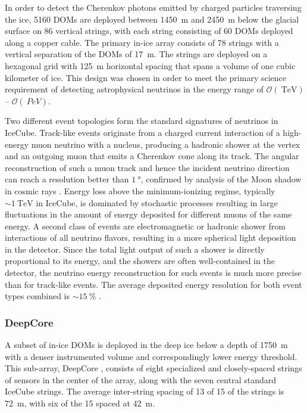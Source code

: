 In order to detect the Cherenkov photons emitted by charged particles
traversing the ice, \num{5160} DOMs are deployed between \SI{1450}{\meter}
and \SI{2450} {\meter} below the glacial surface on \num{86} vertical
strings, with each string consisting of \num{60} DOMs deployed along a copper cable. The
primary in-ice array consists of \num{78} strings with a vertical
separation of the DOMs of \SI{17}{\meter}.  The strings are
deployed on a hexagonal grid with \SI{125}{\meter} horizontal spacing that
spans a volume of one cubic kilometer of ice.  This design was chosen in
order to meet the primary science requirement of detecting astrophysical
neutrinos in the energy range of $\mathcal{O}(\SI{}{\tera\electronvolt})$--
$\mathcal{O}(\SI{}{PeV})$.  %

Two different event topologies form the standard signatures of neutrinos in
IceCube.  Track-like events originate from a charged current interaction of
a high-energy muon neutrino with a nucleus, producing a hadronic shower at
the vertex and an outgoing muon that emits a Cherenkov cone along its
track.  The angular reconstruction of such a muon track and hence the
incident neutrino direction can reach a resolution better than
$\SI{1}{\degree}$, confirmed by analysis of the Moon shadow
in cosmic rays \cite{IC3:moon}. Energy loss above the minimum-ionizing regime, typically $ \sim
\SI{1}{\tera\electronvolt}$ in IceCube, is dominated by stochastic
processes resulting in large fluctuations in the amount of energy deposited
for different muons of the same energy.  A second class of events are
electromagnetic or hadronic shower from interactions of all neutrino
flavors, resulting in a more spherical light deposition in the detector.
Since the total light output of such a shower is directly proportional to its energy, and
the showers are often well-contained in the detector, the neutrino energy
reconstruction for such events is much more precise than for track-like
events. The average deposited energy resolution for both event types
combined is $ \sim \SI{15}{\%}$ \cite{IC3:ereco}.

\subsubsection{DeepCore}

A subset of in-ice DOMs is deployed in the deep ice below a
depth of \SI{1750}{\meter} with a denser instrumented volume and
correspondingly lower energy threshold. This
sub-array, DeepCore \cite{ICECUBE:DC}, consists of eight specialized and
closely-spaced strings of sensors in the center of the array, along with
the seven central standard IceCube strings.  The average inter-string
spacing of 13 of 15 of the strings is \SI{72}{\meter}, with six of the 15
spaced at \SI{42}{\meter}.

